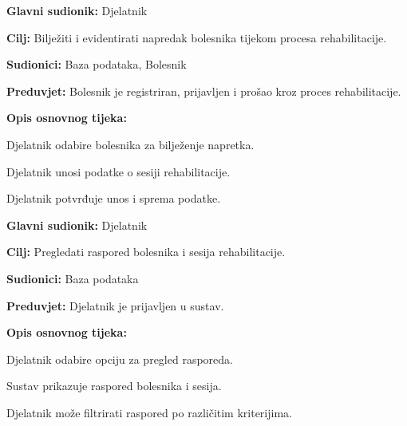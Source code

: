 \documentclass{article}
\begin{document}
\vspace{1em} %
\begin{packed_item}
\item \textbf{Glavni sudionik:} Djelatnik
\item \textbf{Cilj:} Bilježiti i evidentirati napredak bolesnika tijekom procesa rehabilitacije.
\item \textbf{Sudionici:} Baza podataka, Bolesnik
\item \textbf{Preduvjet:} Bolesnik je registriran, prijavljen i prošao kroz proces rehabilitacije.
\item \textbf{Opis osnovnog tijeka:}
\begin{packed_enum}
\item Djelatnik odabire bolesnika za bilježenje napretka.
\item Djelatnik unosi podatke o sesiji rehabilitacije.
\item Djelatnik potvrđuje unos i sprema podatke.
\end{packed_enum}
\end{packed_item}

\vspace{1em} %
\begin{packed_item}
\item \textbf{Glavni sudionik:} Djelatnik
\item \textbf{Cilj:} Pregledati raspored bolesnika i sesija rehabilitacije.
\item \textbf{Sudionici:} Baza podataka
\item \textbf{Preduvjet:} Djelatnik je prijavljen u sustav.
\item \textbf{Opis osnovnog tijeka:}
\begin{packed_enum}
\item Djelatnik odabire opciju za pregled rasporeda.
\item Sustav prikazuje raspored bolesnika i sesija.
\item Djelatnik može filtrirati raspored po različitim kriterijima.
\end{packed_enum}
\end{packed_item}
\end{document}

